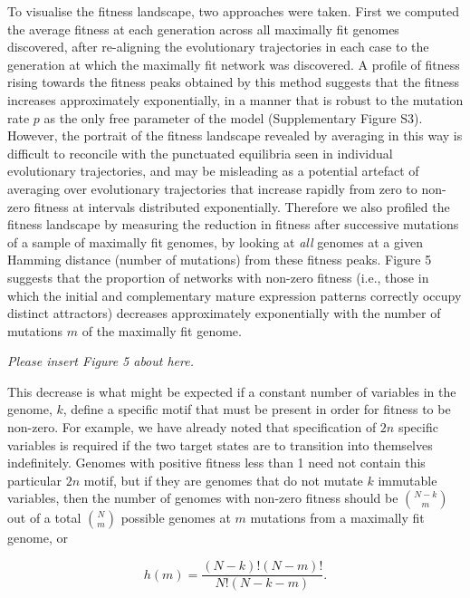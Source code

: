 \documentclass[10pt,letterpaper]{article}
\begin{document}
To visualise the fitness landscape, two approaches were taken. First we computed the average fitness at each generation across all maximally fit genomes discovered, after re-aligning the evolutionary trajectories in each case to the generation at which the maximally fit network was discovered. A profile of fitness rising towards the fitness peaks obtained by this method suggests that the fitness increases approximately exponentially, in a manner that is robust to the mutation rate $p$ as the only free parameter of the model (Supplementary Figure S3). However, the portrait of the fitness landscape revealed by averaging in this way is difficult to reconcile with the punctuated equilibria seen in individual evolutionary trajectories, and may be misleading as a potential artefact of averaging over evolutionary trajectories that increase rapidly from zero to non-zero fitness at intervals distributed exponentially. Therefore we also profiled the fitness landscape by measuring the reduction in fitness after successive mutations of a sample of maximally fit genomes, by looking at \emph{all} genomes at a given Hamming distance (number of mutations) from these fitness peaks. Figure 5 suggests that the proportion of networks with non-zero fitness (i.e., those in which the initial and complementary mature expression patterns correctly occupy distinct attractors) decreases approximately exponentially with the number of mutations $m$ of the maximally fit genome.

\vspace{1em}\emph{\noindent Please insert Figure 5 about here.}\vspace{1em}

This decrease is what might be expected if a constant number of variables in the genome, $k$, define a specific motif that must be present in order for fitness to be non-zero. For example, we have already noted that specification of $2n$ specific variables is required if the two target states are to transition into themselves indefinitely. Genomes with positive fitness less than 1 need not contain this particular $2n$ motif, but if they are genomes that do not mutate $k$ immutable variables, then the number of genomes with non-zero fitness should be ${{N-k}\choose{m}}$ out of a total ${{N}\choose{m}}$ possible genomes at $m$ mutations from a maximally fit genome, or

\begin{equation}
h(m)=\frac{(N-k)! (N-m)!}{N!(N-k-m)}.
\end{equation}
\end{document}
